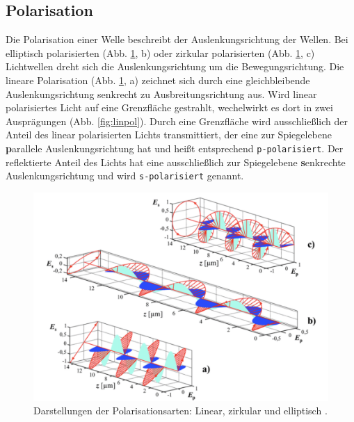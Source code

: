 \subsection{Polarisation}
Die Polarisation einer Welle beschreibt der Auslenkungsrichtung der Wellen.
Bei elliptisch polarisierten (Abb. \ref{fig:polarisation}, b) oder zirkular polarisierten (Abb. \ref{fig:polarisation}, c) Lichtwellen dreht sich die Auslenkungsrichtung um die Bewegungsrichtung.
Die lineare Polarisation (Abb. \ref{fig:polarisation}, a) zeichnet sich durch eine gleichbleibende Auslenkungsrichtung senkrecht zu Ausbreitungsrichtung aus.
Wird linear polarisiertes Licht auf eine Grenzfläche gestrahlt, wechelwirkt es dort in zwei Ausprägungen (Abb. \ref{fig:linpol}).
Durch eine Grenzfläche wird ausschließlich der Anteil des linear polarisierten Lichts transmittiert, der eine zur Spiegelebene \textbf{p}arallele Auslenkungsrichtung hat und heißt entsprechend \texttt{p-polarisiert}.
Der reflektierte Anteil des Lichts hat eine ausschließlich zur Spiegelebene \textbf{s}enkrechte Auslenkungsrichtung und wird \texttt{s-polarisiert} genannt.
\begin{figure}[!ht]
	\centering
	\includegraphics[width=\textwidth]{content/images/polarisation.pdf}
    \caption{Darstellungen der Polarisationsarten: Linear, zirkular und elliptisch \cite{diss-busk}.}
    \label{fig:polarisation}
\end{figure}

